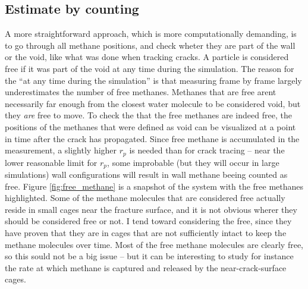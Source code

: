 \subsection{Estimate by counting}
\label{sec:freemethane_counting}
A more straightforward approach, which is more computationally demanding, is to go through all methane positions, and check wheter they are part of the wall or the void, like what was done when tracking cracks. A particle is considered free if it was part of the void at any time during the simulation. The reason for the ``at any time during the simulation'' is that measuring frame by frame largely underestimates the number of free methanes. Methanes that are free arent necessarily far enough from the closest water molecule to be considered void, but they \emph{are} free to move. To check the that the free methanes are indeed free, the positions of the methanes that were defined as void can be visualized at a point in time after the crack has propagated. Since free methane is accumulated in the measurement, a slightly higher $r_p$ is needed than for crack tracing -- near the lower reasonable limit for $r_p$, some improbable (but they will occur in large simulations) wall configurations will result in wall methane beeing counted as free. Figure \ref{fig:free_methane} is a snapshot of the system with the free methanes highlighted. Some of the methane molecules that are considered free actually reside in small cages near the fracture surface, and it is not obvious wherer they should be considered free or not. I tend toward considering the free, since they have proven that they are in cages that are not sufficiently intact to keep the methane molecules over time. Most of the free methane molecules are clearly free, so this sould not be a big issue -- but it can be interesting to study for instance the rate at which methane is captured and released by the near-crack-surface cages.

